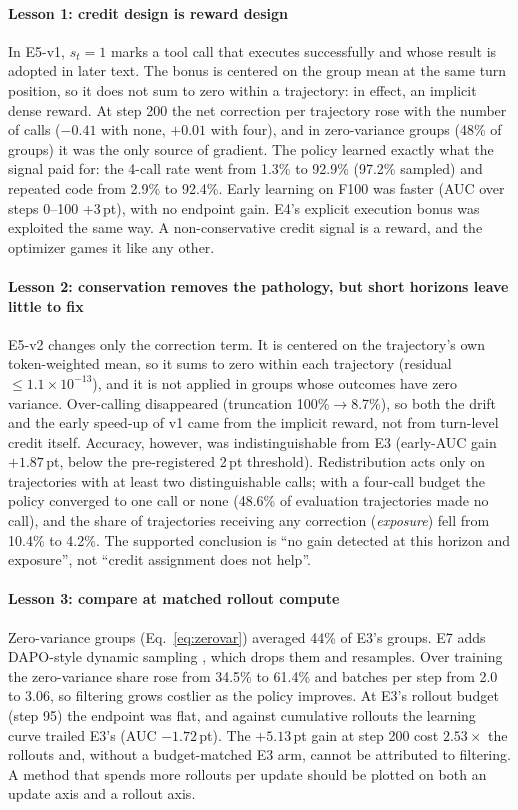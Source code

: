 \paragraph{Lesson 1: credit design is reward design}
In E5-v1, $s_t{=}1$ marks a tool call that executes successfully and whose result is adopted in later text. The bonus is centered on the group mean at the same turn position, so it does not sum to zero within a trajectory: in effect, an implicit dense reward. At step 200 the net correction per trajectory rose with the number of calls ($-0.41$ with none, $+0.01$ with four), and in zero-variance groups (48\% of groups) it was the only source of gradient. The policy learned exactly what the signal paid for: the 4-call rate went from 1.3\% to 92.9\% (97.2\% sampled) and repeated code from 2.9\% to 92.4\%. Early learning on F100 was faster (AUC over steps 0--100 +3\,pt), with no endpoint gain. E4's explicit execution bonus was exploited the same way. A non-conservative credit signal is a reward, and the optimizer games it like any other.

\paragraph{Lesson 2: conservation removes the pathology, but short horizons leave little to fix}
E5-v2 changes only the correction term. It is centered on the trajectory's own token-weighted mean, so it sums to zero within each trajectory (residual ${\le}1.1{\times}10^{-13}$), and it is not applied in groups whose outcomes have zero variance. Over-calling disappeared (truncation 100\%$\to$8.7\%), so both the drift and the early speed-up of v1 came from the implicit reward, not from turn-level credit itself. Accuracy, however, was indistinguishable from E3 (early-AUC gain $+1.87$\,pt, below the pre-registered 2\,pt threshold). Redistribution acts only on trajectories with at least two distinguishable calls; with a four-call budget the policy converged to one call or none (48.6\% of evaluation trajectories made no call), and the share of trajectories receiving any correction (\emph{exposure}) fell from 10.4\% to 4.2\%. The supported conclusion is ``no gain detected at this horizon and exposure'', not ``credit assignment does not help''.

\paragraph{Lesson 3: compare at matched rollout compute}
Zero-variance groups (Eq.~\ref{eq:zerovar}) averaged 44\% of E3's groups. E7 adds DAPO-style dynamic sampling \citep{yu2025dapo}, which drops them and resamples. Over training the zero-variance share rose from 34.5\% to 61.4\% and batches per step from 2.0 to 3.06, so filtering grows costlier as the policy improves. At E3's rollout budget (step 95) the endpoint was flat, and against cumulative rollouts the learning curve trailed E3's (AUC $-1.72$\,pt). The $+5.13$\,pt gain at step 200 cost $2.53\times$ the rollouts and, without a budget-matched E3 arm, cannot be attributed to filtering. A method that spends more rollouts per update should be plotted on both an update axis and a rollout axis.

